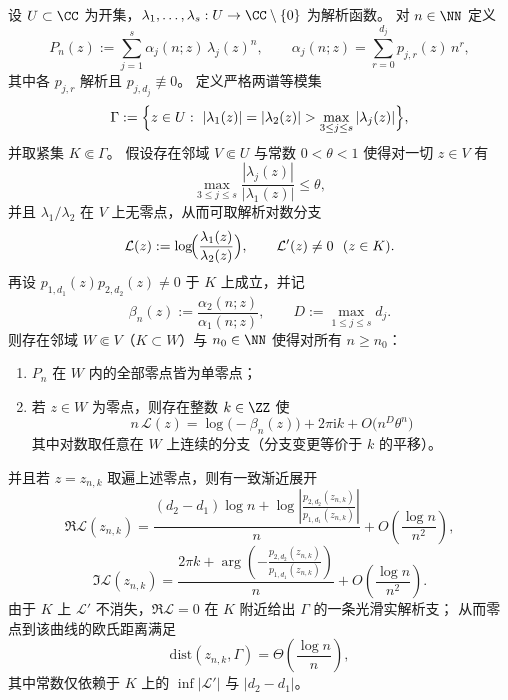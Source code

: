 \begin{theorem}[两谱竞争下零点的对数位移定量律]\label{thm:xi-leyang-logshift-two-spectrum}
设 \(U\subset\CC\) 为开集，\(\lambda_1,\dots,\lambda_s:U\to\CC\setminus\{0\}\) 为解析函数。
对 \(n\in\NN\) 定义
\[
P_n(z):=\sum_{j=1}^{s}\alpha_j(n;z)\,\lambda_j(z)^n,
\qquad
\alpha_j(n;z)=\sum_{r=0}^{d_j}p_{j,r}(z)\,n^r,
\]
其中各 \(p_{j,r}\) 解析且 \(p_{j,d_j}\not\equiv 0\)。
定义严格两谱等模集
\[
\Gamma:=\Bigl\{z\in U:\ |\lambda_1(z)|=|\lambda_2(z)|>\max_{3\le j\le s}|\lambda_j(z)|\Bigr\},
\]
并取紧集 \(K\Subset \Gamma\)。
假设存在邻域 \(V\Subset U\) 与常数 \(0<\theta<1\) 使得对一切 \(z\in V\) 有
\[
\max_{3\le j\le s}\frac{|\lambda_j(z)|}{|\lambda_1(z)|}\le \theta,
\]
并且 \(\lambda_1/\lambda_2\) 在 \(V\) 上无零点，从而可取解析对数分支
\[
\mathcal{L}(z):=\log\!\Bigl(\frac{\lambda_1(z)}{\lambda_2(z)}\Bigr),
\qquad
\mathcal{L}'(z)\neq 0\ \ (z\in K).
\]
再设 \(p_{1,d_1}(z)p_{2,d_2}(z)\neq 0\) 于 \(K\) 上成立，并记
\[
\beta_n(z):=\frac{\alpha_2(n;z)}{\alpha_1(n;z)},
\qquad
D:=\max_{1\le j\le s}d_j.
\]
则存在邻域 \(W\Subset V\)（\(K\subset W\)）与 \(n_0\in\NN\) 使得对所有 \(n\ge n_0\)：
\begin{enumerate}
  \item \(P_n\) 在 \(W\) 内的全部零点皆为单零点；
  \item 若 \(z\in W\) 为零点，则存在整数 \(k\in\ZZ\) 使
  \begin{equation}\label{eq:xi-leyang-logshift-quant}
  \boxed{\;
  n\,\mathcal{L}(z)=\log\!\bigl(-\beta_n(z)\bigr)+2\pi \mathrm{i}k+O\!\bigl(n^{D}\theta^n\bigr)\;}
  \end{equation}
  其中对数取任意在 \(W\) 上连续的分支（分支变更等价于 \(k\) 的平移）。
\end{enumerate}
并且若 \(z=z_{n,k}\) 取遍上述零点，则有一致渐近展开
\[
\Re \mathcal{L}(z_{n,k})
=\frac{(d_2-d_1)\log n+\log\left|\frac{p_{2,d_2}(z_{n,k})}{p_{1,d_1}(z_{n,k})}\right|}{n}
+O\!\left(\frac{\log n}{n^2}\right),
\]
\[
\Im \mathcal{L}(z_{n,k})
=\frac{2\pi k+\arg\!\left(-\frac{p_{2,d_2}(z_{n,k})}{p_{1,d_1}(z_{n,k})}\right)}{n}
+O\!\left(\frac{\log n}{n^2}\right).
\]
由于 \(K\) 上 \(\mathcal{L}'\) 不消失，\(\Re\mathcal{L}=0\) 在 \(K\) 附近给出 \(\Gamma\) 的一条光滑实解析支；
从而零点到该曲线的欧氏距离满足
\[
\mathrm{dist}(z_{n,k},\Gamma)=\Theta\!\left(\frac{\log n}{n}\right),
\]
其中常数仅依赖于 \(K\) 上的 \(\inf|\mathcal{L}'|\) 与 \(|d_2-d_1|\)。
\end{theorem}
